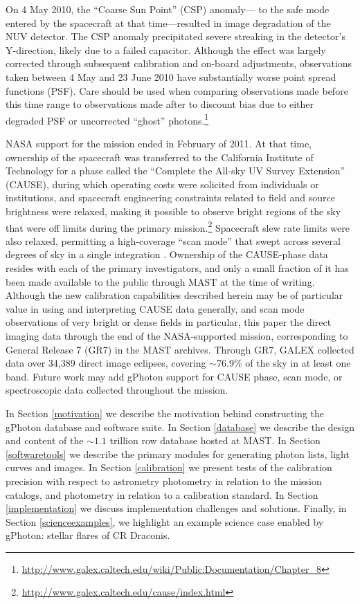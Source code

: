 \documentclass[trackchanges,preprint2]{aastex}
\begin{document}
On 4 May 2010, the ``Coarse Sun Point'' (CSP) anomaly--- to the safe mode entered by the spacecraft at that time---resulted in image degradation of the NUV detector. The CSP anomaly precipitated severe streaking in the detector's Y-direction, likely due to a failed capacitor. Although the effect was largely corrected through subsequent calibration and on-board adjustments, observations taken between 4 May and 23 June 2010 have substantially worse point spread functions (PSF). Care should be used when comparing observations made before this time range to observations made after to discount bias due to either degraded PSF or uncorrected ``ghost'' photons.\footnote{\url{http://www.galex.caltech.edu/wiki/Public:Documentation/Chapter_8}}

NASA support for the mission ended in February of 2011. At that time, ownership of the spacecraft was transferred to the California Institute of Technology for a phase called the ``Complete the All-sky UV Survey Extension'' (CAUSE), during which operating costs were solicited from individuals or institutions, and spacecraft engineering constraints related to field and source brightness were relaxed, making it possible to observe bright regions of the sky that were off limits during the primary mission.\footnote{\url{http://www.galex.caltech.edu/cause/index.html}} Spacecraft slew rate limits were also relaxed, permitting a high-coverage ``scan mode'' that swept across several degrees of sky in a single integration . Ownership of the CAUSE-phase data resides with each of the primary investigators, and only a small fraction of it has been made available to the public through MAST at the time of writing.  Although the new calibration capabilities described herein may be of particular value in using and interpreting CAUSE data generally, and scan mode observations of very bright or dense fields in particular, this paper  the direct imaging data through the end of the NASA-supported mission, corresponding to General Release 7 (GR7) in the MAST archives. Through GR7, GALEX collected data over 34,389 direct image eclipses, covering $\sim76.9\%$ of the sky in at least one band. Future work may add gPhoton support for CAUSE phase, scan mode, or spectroscopic data collected throughout the mission.

In Section \ref{motivation} we describe the motivation behind constructing the gPhoton database and software suite. In Section \ref{database} we describe the design and content of the $\sim 1.1$ trillion row database hosted at MAST. In Section \ref{softwaretools} we describe the primary modules for generating photon lists, light curves and images. In Section \ref{calibration} we present tests of the calibration precision with respect to astrometry  photometry in relation to the mission catalogs, and photometry in relation to a calibration standard. In Section \ref{implementation} we discuss implementation challenges and solutions. Finally, in Section \ref{scienceexamples}, we highlight an example science case enabled by gPhoton: stellar flares of CR Draconis.
\end{document}
